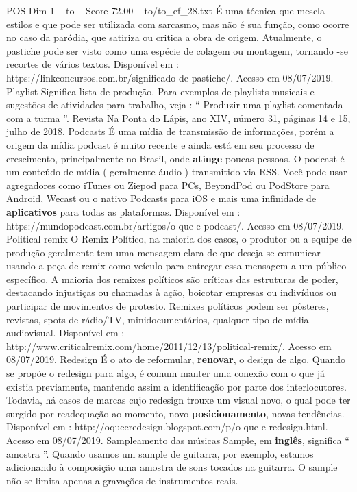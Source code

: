 \begin{textsample}{POS Dim 1 – to – Score 72.00 – to/to\_ef\_28.txt}
É uma técnica que mescla estilos e que pode ser utilizada com sarcasmo, mas não é sua função, como ocorre no caso da paródia, que satiriza ou critica a obra de origem.
Atualmente, o pastiche pode ser visto como uma espécie de colagem ou montagem, tornando -se recortes de vários textos.
Disponível em : https://linkconcursos.com.br/significado-de-pastiche/.
Acesso em 08/07/2019.
Playlist Significa lista de produção.
Para exemplos de playlists musicais e sugestões de atividades para trabalho, veja : “ Produzir uma playlist comentada com a turma ”.
Revista Na Ponta do Lápis, ano XIV, número 31, páginas 14 e 15, julho de 2018.
Podcasts É uma mídia de transmissão de informações, porém a origem da mídia podcast é muito recente e ainda está em seu processo de crescimento, principalmente no Brasil, onde \textbf{atinge} poucas pessoas.
O podcast é um conteúdo de mídia ( geralmente áudio ) transmitido via RSS.
Você pode usar agregadores como iTunes ou Ziepod para PCs, BeyondPod ou PodStore para Android, Wecast ou o nativo Podcasts para iOS e mais uma infinidade de \textbf{aplicativos} para todas as plataformas.
Disponível em : https://mundopodcast.com.br/artigos/o-que-e-podcast/.
Acesso em 08/07/2019.
Political remix O Remix Político, na maioria dos casos, o produtor ou a equipe de produção geralmente tem uma mensagem clara de que deseja se comunicar usando a peça de remix como veículo para entregar essa mensagem a um público específico.
A maioria dos remixes políticos são críticas das estruturas de poder, destacando injustiças ou chamadas à ação, boicotar empresas ou indivíduos ou participar de movimentos de protesto.
Remixes políticos podem ser pôsteres, revistas, spots de rádio/TV, minidocumentários, qualquer tipo de mídia audiovisual.
Disponível em : http://www.criticalremix.com/home/2011/12/13/political-remix/.
Acesso em 08/07/2019.
Redesign É o ato de reformular, \textbf{renovar}, o design de algo.
Quando se propõe o redesign para algo, é comum manter uma conexão com o que já existia previamente, mantendo assim a identificação por parte dos interlocutores.
Todavia, há casos de marcas cujo redesign trouxe um visual novo, o qual pode ter surgido por readequação ao momento, novo \textbf{posicionamento}, novas tendências.
Disponível em : http://oqueeredesign.blogspot.com/p/o-que-e-redesign.html.
Acesso em 08/07/2019.
Sampleamento das músicas Sample, em \textbf{inglês}, significa “ amostra ”.
Quando usamos um sample de guitarra, por exemplo, estamos adicionando à composição uma amostra de sons tocados na guitarra.
O sample não se limita apenas a gravações de instrumentos reais.

\end{textsample}
